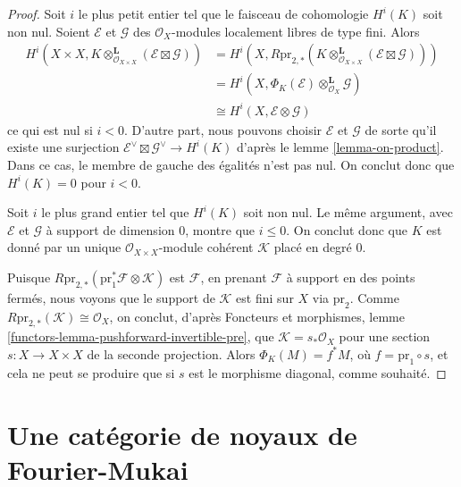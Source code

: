 \begin{proof}
Soit $i$ le plus petit entier tel que le faisceau de cohomologie $H^i(K)$ soit
non nul. Soient $\mathcal{E}$ et $\mathcal{G}$ des $\mathcal{O}_X$-modules
localement libres de type fini. Alors
\begin{align*}
H^i(X \times X, K \otimes_{\mathcal{O}_{X \times X}}^\mathbf{L}
(\mathcal{E} \boxtimes \mathcal{G}))
& =
H^i(X, R\text{pr}_{2, *}(K \otimes_{\mathcal{O}_{X \times X}}^\mathbf{L}
(\mathcal{E} \boxtimes \mathcal{G}))) \\
& =
H^i(X, \Phi_K(\mathcal{E}) \otimes_{\mathcal{O}_X}^\mathbf{L} \mathcal{G}) \\
& \cong
H^i(X, \mathcal{E} \otimes \mathcal{G})
\end{align*}
ce qui est nul si $i < 0$. D'autre part, nous pouvons choisir
$\mathcal{E}$ et $\mathcal{G}$ de sorte qu'il existe une surjection
$\mathcal{E}^\vee \boxtimes \mathcal{G}^\vee \to H^i(K)$
d'après le lemme \ref{lemma-on-product}.
Dans ce cas, le membre de gauche des égalités n'est pas nul.
On conclut donc que $H^i(K) = 0$ pour $i < 0$.

\medskip\noindent
Soit $i$ le plus grand entier tel que $H^i(K)$ soit non nul.
Le même argument, avec $\mathcal{E}$ et $\mathcal{G}$ à support de dimension $0$,
montre que $i \leq 0$.
On conclut donc que $K$ est donné par un unique
$\mathcal{O}_{X \times X}$-module cohérent $\mathcal{K}$ placé en degré $0$.

\medskip\noindent
Puisque $R\text{pr}_{2, *}(\text{pr}_1^*\mathcal{F} \otimes \mathcal{K})$
est $\mathcal{F}$, en prenant $\mathcal{F}$ à support en des points fermés,
nous voyons que le support de $\mathcal{K}$ est fini sur $X$ via
$\text{pr}_2$. Comme $R\text{pr}_{2, *}(\mathcal{K}) \cong \mathcal{O}_X$,
on conclut, d'après Foncteurs et morphismes, lemme
\ref{functors-lemma-pushforward-invertible-pre},
que $\mathcal{K} = s_*\mathcal{O}_X$ pour une section $s : X \to X \times X$
de la seconde projection. Alors $\Phi_K(M) = f^*M$, où
$f = \text{pr}_1 \circ s$, et cela ne peut se produire que si $s$
est le morphisme diagonal, comme souhaité.
\end{proof}








\section{Une catégorie de noyaux de Fourier-Mukai}
\label{section-category-Fourier-Mukai-kernels}

